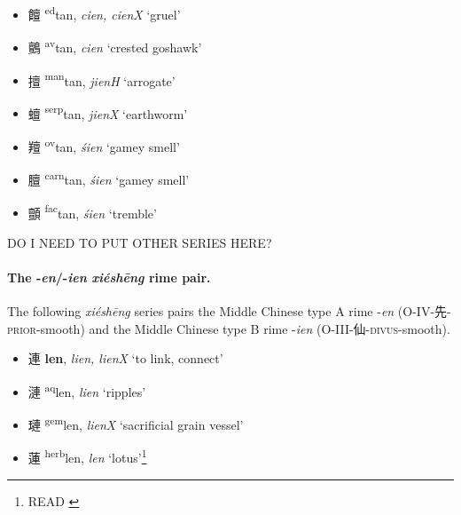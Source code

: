 \begin{itemize}
  \item {\Large{饘}} %
    {\large{{\textsuperscript{ed}}tan}},
    \textit{cien, cienX} `gruel' %

  \item {\Large{鸇}} %
    {\large{{\textsuperscript{av}}tan}},
    \textit{cien} `crested goshawk' %

  \item {\Large{擅}} %
    {\large{{\textsuperscript{man}}tan}},
    \textit{jienH} `arrogate' %

  \item {\Large{蟺}} %
    {\large{{\textsuperscript{serp}}tan}},
    \textit{jienX} `earthworm' %

  \item {\Large{羶}} %
    {\large{{\textsuperscript{ov}}tan}},
    \textit{śien} `gamey smell' %

  \item {\Large{膻}} %
    {\large{{\textsuperscript{carn}}tan}},
    \textit{śien} `gamey smell' %

  \item {\Large{顫}} %
    {\large{{\textsuperscript{fac}}tan}},
    \textit{śien} `tremble' %
\end{itemize}

DO I NEED TO PUT OTHER SERIES HERE?

\paragraph{The -\textit{en}/-\textit{ien} \textit{xiéshēng} rime pair.}
\label{par:en-ien-XS-pair}
The following \textit{xiéshēng} series pairs the Middle Chinese type A rime 
-\textit{en} (O-IV-先-\textsc{prior}-smooth)
and the Middle Chinese type B
rime -\textit{ien}
(O-III-仙-\textsc{divus}-smooth).
\begin{itemize}
  \item {\Large{連}} %
    {\large{\textbf{len}}},
    \textit{lien, lienX} `to link, connect' %

  \item {\Large{漣}} %
    {\large{{\textsuperscript{aq}}len}},
    \textit{lien} `ripples' %

  \item {\Large{璉}} %
    {\large{{\textsuperscript{gem}}len}},
    \textit{lienX} `sacrificial grain vessel' %

  \item {\Large{蓮}} %
    {\large{{\textsuperscript{herb}}len}},
    \textit{len} `lotus'\footnote{READ \cite[361]{baxter_handbook_1992}} %
\end{itemize}

